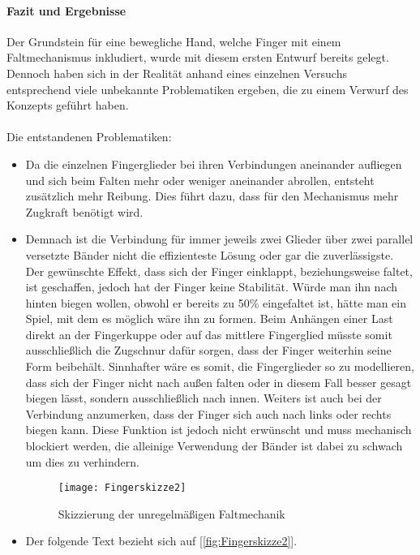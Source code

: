 \documentclass[titlepage,12pt,twoside]{article}
\begin{document}
\paragraph{Fazit und Ergebnisse}
\label{par:Fazit und Ergebnisse}
\hfill \break
\hfill \break
Der Grundstein für eine bewegliche Hand, welche Finger mit einem 
Faltmechanismus inkludiert, wurde mit diesem ersten Entwurf bereits gelegt. 
Dennoch haben sich in der Realität anhand eines einzelnen Versuchs 
entsprechend viele unbekannte Problematiken ergeben, die zu einem Verwurf des 
Konzepts geführt haben. \\
\\
Die entstandenen Problematiken:
\begin{itemize}
	\item Da die einzelnen Fingerglieder bei ihren Verbindungen aneinander 
	aufliegen und sich beim Falten mehr oder weniger aneinander abrollen, 
	entsteht zusätzlich mehr Reibung. Dies führt dazu, dass für den Mechanismus mehr Zugkraft benötigt wird.
	\item Demnach ist die Verbindung für immer jeweils zwei Glieder über zwei 
	parallel versetzte Bänder nicht die effizienteste Lösung oder gar die zuverlässigste. 
	Der gewünschte Effekt, dass sich der Finger einklappt, beziehungsweise 
	faltet, ist geschaffen, jedoch hat der Finger keine Stabilität. Würde man 
	ihn nach hinten biegen wollen, obwohl er bereits zu 50\% eingefaltet ist, 
	hätte man ein Spiel, mit dem es möglich wäre ihn zu formen. Beim Anhängen 
	einer Last direkt an der Fingerkuppe oder auf das mittlere Fingerglied 
	müsste somit ausschließlich die Zugschnur dafür sorgen, dass der Finger 
	weiterhin seine Form beibehält. Sinnhafter wäre es somit, die Fingerglieder 
	so zu modellieren, dass sich der Finger nicht nach außen falten oder in 
	diesem Fall besser gesagt biegen lässt, sondern ausschließlich nach innen. 
	Weiters ist auch bei der Verbindung anzumerken, dass der Finger sich auch 
	nach links oder rechts biegen kann. Diese Funktion ist jedoch nicht 
	erwünscht und muss mechanisch blockiert werden, die alleinige Verwendung der 
	Bänder ist dabei zu schwach um dies zu verhindern.
	\begin{figure}[H]
		\begin{center}
			\scalebox{1.2}
			{\texttt{[image: Fingerskizze2]}}
			\caption{Skizzierung der unregelmäßigen Faltmechanik}
			\label{fig:Fingerskizze2}			
		\end{center}
	\end{figure}
	\hfill \break
	\item Der folgende Text bezieht sich auf [\textcolor{blue}{\autoref{fig:Fingerskizze2}}]. \\

\end{itemize}
\end{document}
